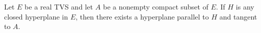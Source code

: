 Let $E$ be a real TVS and let $A$ be a nonempty compact subset of $E$. If $H$ is any closed hyperplane in $E$, then there exists a hyperplane parallel to $H$ and tangent to $A$.